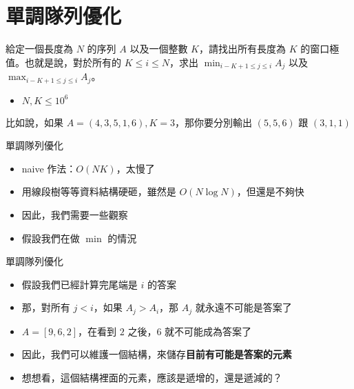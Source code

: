 \documentclass[standalone]{beamer}
\begin{document}
\section{單調隊列優化}

\begin{frame}{}
  \begin{problem}
    給定一個長度為 $N$ 的序列 $A$ 以及一個整數 $K$，請找出所有長度為 $K$ 的窗口極值。也就是說，對於所有的 $K \leq i \leq N$，求出 $\min_{i - K + 1 \leq j \leq i}A_j$ 以及 $\max_{i - K + 1 \leq j \leq i}A_j$。

    \begin{itemize}
      \item $N, K \leq 10^6$
    \end{itemize}

    比如說，如果 $A = (4, 3, 5, 1, 6), K = 3$，那你要分別輸出 $(5, 5, 6)$ 跟 $(3, 1, 1)$
  \end{problem}
\end{frame}

\begin{frame}{單調隊列優化}
  \begin{itemize}
    \item naive 作法：$O(NK)$，太慢了
    \item 用線段樹等等資料結構硬砸，雖然是 $O(N \log N)$，但還是不夠快
    \item 因此，我們需要一些觀察
    \item 假設我們在做 $\min$ 的情況
  \end{itemize}
\end{frame}

\begin{frame}{單調隊列優化}
  \begin{itemize}
    \item 假設我們已經計算完尾端是 $i$ 的答案
    \item 那，對所有 $j < i$，如果 $A_j > A_i$，那 $A_j$ 就永遠不可能是答案了
    \item $A = [9, 6, 2]$，在看到 $2$ 之後，$6$ 就不可能成為答案了
    \item 因此，我們可以維護一個結構，來儲存\textbf{目前有可能是答案的元素}
    \item 想想看，這個結構裡面的元素，應該是遞增的，還是遞減的？
  \end{itemize}
\end{frame}
\end{document}
